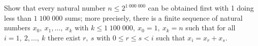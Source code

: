 Show that every natural number $n\leq2^{1\;000\;000}$ can be obtained first with 1 doing less than $1\;100\;000$ sums; more precisely, there is a finite sequence of natural numbers $x_0,\ x_1,\dots,\ x_k\mbox{ with }k\leq1\;100\;000,\ x_0=1,\ x_k=n$ such that for all $i=1,\ 2,\dots,\ k$ there exist $r,\ s$ with $0\leq{r}\leq{s}<i$ such that $x_i=x_r+x_s$.
